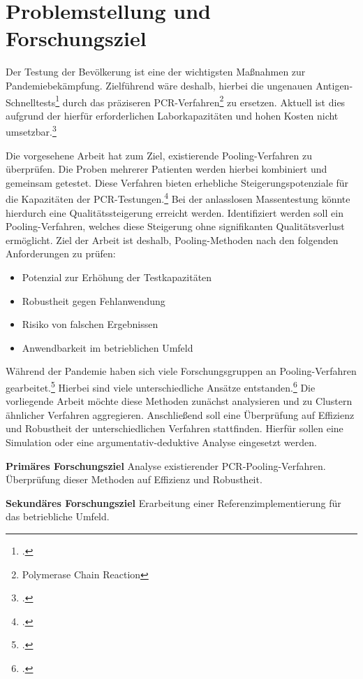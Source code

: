 
\chapter{Problemstellung und Forschungsziel}
Der Testung der Bevölkerung ist eine der wichtigsten Maßnahmen zur Pandemiebekämpfung.
Zielführend wäre deshalb, hierbei die ungenauen Antigen-Schnelltests\footcite{WuerzburgStudie}
durch das präziseren PCR-Verfahren\footnote{Polymerase Chain Reaction}
zu ersetzen.
Aktuell ist dies aufgrund der hierfür erforderlichen Laborkapazitäten und hohen Kosten nicht umsetzbar.\footcite{rki-bericht_2021}

Die vorgesehene Arbeit hat zum Ziel, existierende Pooling-Verfahren zu überprüfen.
Die Proben mehrerer Patienten werden hierbei kombiniert und gemeinsam getestet.
Diese Verfahren bieten erhebliche Steigerungspotenziale für die Kapazitäten der PCR-Testungen.\footcite{Aertzeblatt}
Bei der anlasslosen Massentestung könnte hierdurch eine Qualitätssteigerung erreicht werden.
Identifiziert werden soll ein Pooling-Verfahren, welches diese Steigerung ohne signifikanten Qualitätsverlust ermöglicht.
Ziel der Arbeit ist deshalb, Pooling-Methoden nach den folgenden Anforderungen zu prüfen:
\begin{itemize}
\setlength{\itemsep}{-8pt}
\item Potenzial zur Erhöhung der Testkapazitäten
\item Robustheit gegen Fehlanwendung
\item Risiko von falschen Ergebnissen
\item Anwendbarkeit im betrieblichen Umfeld
\end{itemize}

Während der Pandemie haben sich viele Forschungsgruppen an Pooling-Verfahren gearbeitet.\footcite{viehweger_increased_2020}
Hierbei sind viele unterschiedliche Ansätze entstanden.\footcite{verwilt_evaluation_2021}
Die vorliegende Arbeit möchte diese Methoden zunächst analysieren und zu Clustern ähnlicher Verfahren aggregieren.
Anschließend soll  eine Überprüfung auf Effizienz und Robustheit der unterschiedlichen Verfahren stattfinden.
Hierfür sollen eine Simulation oder eine argumentativ-deduktive Analyse eingesetzt werden.

\textbf{Primäres Forschungsziel}\newline
 Analyse existierender PCR-Pooling-Verfahren.\newline
 Überprüfung dieser Methoden auf Effizienz und Robustheit.
 
 \textbf{Sekundäres Forschungsziel}\newline 
 Erarbeitung einer Referenzimplementierung für das betriebliche Umfeld.\newline